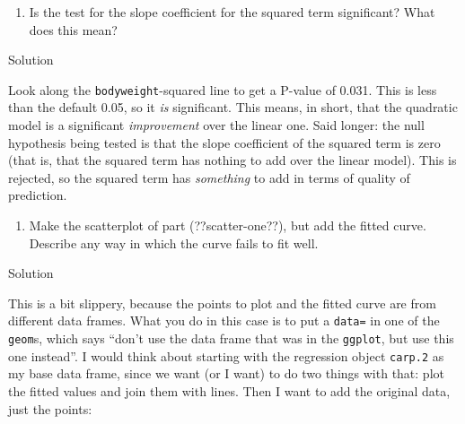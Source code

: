 \documentclass[]{tufte-book}
\newenvironment{Shaded}{}{}
\newcommand{\DataTypeTok}[1]{\textcolor[rgb]{0.56,0.13,0.00}{#1}}
\newcommand{\FloatTok}[1]{\textcolor[rgb]{0.25,0.63,0.44}{#1}}
\newcommand{\KeywordTok}[1]{\textcolor[rgb]{0.00,0.44,0.13}{\textbf{#1}}}
\newcommand{\NormalTok}[1]{#1}
\newcommand{\OperatorTok}[1]{\textcolor[rgb]{0.40,0.40,0.40}{#1}}
\newcommand{\StringTok}[1]{\textcolor[rgb]{0.25,0.44,0.63}{#1}}
\providecommand{\tightlist}{%
  \setlength{\itemsep}{0pt}\setlength{\parskip}{0pt}}
\theoremstyle{definition}
\theoremstyle{definition}
\theoremstyle{definition}
\theoremstyle{remark}
\begin{document}
\begin{enumerate}
\def\labelenumi{(\alph{enumi})}
\setcounter{enumi}{6}
\tightlist
\item
  Is the test for the slope coefficient for the squared term
  significant? What does this mean?
\end{enumerate}

Solution

Look along the \texttt{bodyweight}-squared line to get a P-value of
0.031. This is less than the default 0.05, so it \emph{is} significant.
This means, in short, that the quadratic model is a significant
\emph{improvement} over the linear one.
 Said longer: the
null hypothesis being tested is that the slope coefficient of the
squared term is zero (that is, that the squared term has nothing to add
over the linear model). This is rejected, so the squared term has
\emph{something} to add in terms of quality of prediction.

\begin{enumerate}
\def\labelenumi{(\alph{enumi})}
\setcounter{enumi}{7}
\tightlist
\item
  Make the scatterplot of part (??scatter-one??), but add the fitted
  curve. Describe any way in which the curve fails to fit well.
\end{enumerate}

Solution

This is a bit slippery, because the points to plot and the fitted curve
are from different data frames. What you do in this case is to put a
\texttt{data=} in one of the \texttt{geom}s, which says ``don't use the
data frame that was in the \texttt{ggplot}, but use this one instead''.
I would think about starting with the regression object \texttt{carp.2}
as my base data frame, since we want (or I want) to do two things with
that: plot the fitted values and join them with lines. Then I want to
add the original data, just the points:

\begin{Shaded}
\end{Shaded}
\end{document}
